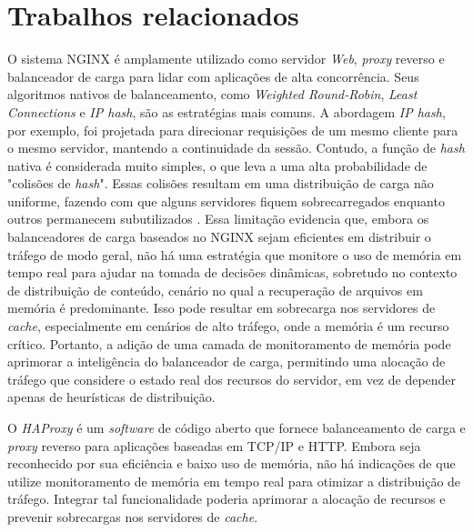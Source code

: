 \section{Trabalhos relacionados}

O sistema NGINX é amplamente utilizado como servidor \textit{Web}, \textit{proxy} reverso e balanceador de carga para lidar com aplicações de alta concorrência. Seus algoritmos nativos de balanceamento, como \textit{Weighted Round-Robin}, \textit{Least Connections} e \textit{IP hash}, são as estratégias mais comuns. A abordagem \textit{IP hash}, por exemplo, foi projetada para direcionar requisições de um mesmo cliente para o mesmo servidor, mantendo a continuidade da sessão.  Contudo, a função de \textit{hash} nativa é considerada muito simples, o que leva a uma alta probabilidade de "colisões de \textit{hash}".  Essas colisões resultam em uma distribuição de carga não uniforme, fazendo com que alguns servidores fiquem sobrecarregados enquanto outros permanecem subutilizados \cite{nginxAlgorithmsEvaluationYuhong2022}. Essa limitação evidencia que, embora os balanceadores de carga baseados no NGINX sejam eficientes em distribuir o tráfego de modo geral, não há uma estratégia que monitore o uso de memória em tempo real para ajudar na tomada de decisões dinâmicas, sobretudo no contexto de distribuição de conteúdo, cenário no qual a recuperação de arquivos em memória é predominante. Isso pode resultar em sobrecarga nos servidores de \textit{cache}, especialmente em cenários de alto tráfego, onde a memória é um recurso crítico. Portanto, a adição de uma camada de monitoramento de memória pode aprimorar a inteligência do balanceador de carga, permitindo uma alocação de tráfego que considere o estado real dos recursos do servidor, em vez de depender apenas de heurísticas de distribuição.

O \textit{HAProxy} \cite{haproxy} é um \textit{software} de código aberto que fornece balanceamento de carga e \textit{proxy} reverso para aplicações baseadas em TCP/IP e HTTP. Embora seja reconhecido por sua eficiência e baixo uso de memória, não há indicações de que utilize monitoramento de memória em tempo real para otimizar a distribuição de tráfego. Integrar tal funcionalidade poderia aprimorar a alocação de recursos e prevenir sobrecargas nos servidores de \textit{cache}.

